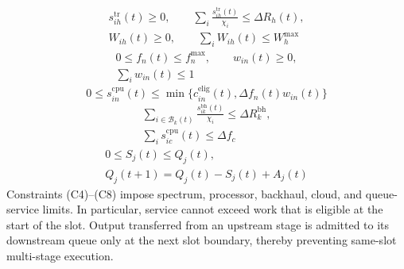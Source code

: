 \begin{equation}
\begin{gathered}
s_{ih}^{\mathrm{tr}}(t)\ge0,\qquad
\sum_i\frac{s_{ih}^{\mathrm{tr}}(t)}{\chi_i}\le\Delta R_h(t),\\
W_{ih}(t)\ge0,\qquad \sum_iW_{ih}(t)\le W_h^{\max}
\end{gathered}
\tag{C4}\label{con:radio}
\end{equation}
\begin{equation}
\begin{gathered}
0\le f_n(t)\le f_n^{\max},\qquad w_{in}(t)\ge0,\\
\sum_iw_{in}(t)\le1
\end{gathered}
\tag{C5}\label{con:processor}
\end{equation}
\begin{equation}
0\le s_{in}^{\mathrm{cpu}}(t)\le
\min\{c_{in}^{\mathrm{elig}}(t),\Delta f_n(t)w_{in}(t)\}
\tag{C6}\label{con:cpu-service}
\end{equation}
\begin{equation}
\begin{gathered}
\sum_{i\in\mathcal B_k(t)}\frac{s_{ik}^{\mathrm{bh}}(t)}{\chi_i}
\le\Delta R_k^{\mathrm{bh}},\\
\sum_i s_{ic}^{\mathrm{cpu}}(t)\le\Delta f_c
\end{gathered}
\tag{C7}\label{con:backhaul-cloud}
\end{equation}
\begin{equation}
\begin{gathered}
0\le S_j(t)\le Q_j(t),\\
Q_j(t+1)=Q_j(t)-S_j(t)+A_j(t)
\end{gathered}
\tag{C8}\label{con:queue-causality}
\end{equation}
Constraints (C4)--(C8) impose spectrum, processor, backhaul, cloud, and
queue-service limits. In particular, service cannot exceed work that is
eligible at the start of the slot. Output transferred from an upstream stage
is admitted to its downstream queue only at the next slot boundary, thereby
preventing same-slot multi-stage execution.

